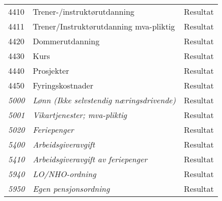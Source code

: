 \begin{table}[H]
\begin{tabular}{l l l }
4410 & Trener-/instruktørutdanning & Resultat\\
4411 & Trener/Instruktørutdanning mva-pliktig & Resultat\\
4420 & Dommerutdanning & Resultat\\
4430 & Kurs & Resultat\\
4440 & Prosjekter & Resultat\\
4450 & Fyringskostnader & Resultat\\
\emph{5000} & \emph{Lønn (Ikke selvstendig næringsdrivende)} & Resultat\\
\emph{5001} & \emph{Vikartjenester; mva-pliktig} & Resultat\\
\emph{5020} & \emph{Feriepenger} & Resultat\\
\emph{5400} & \emph{Arbeidsgiveravgift} & Resultat\\
\emph{5410} & \emph{Arbeidsgiveravgift av feriepenger} & Resultat\\
\emph{5940} & \emph{LO/NHO-ordning} & Resultat\\
\emph{5950} & \emph{Egen pensjonsordning} & Resultat\\
	\end{tabular}
\end{table}
